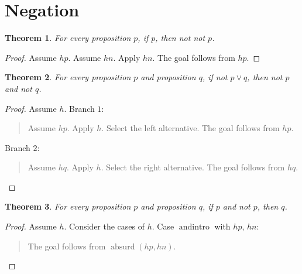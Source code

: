 \documentclass[11pt]{article}
\newtheorem{theorem}{Theorem}[section]
\theoremstyle{definition}
\begin{document}
\section{Negation}
\label{ll:main:negation}
\begin{theorem}
\label{ll:main:double-negation-intro}
For every proposition \(p\), if \(p\), then not not \(p\).
\end{theorem}
\begin{proof}
Assume \(hp\).
Assume \(hn\).
Apply \(hn\).
The goal follows from \(hp\).
\end{proof}
\begin{theorem}
\label{ll:main:de-morgan}
For every proposition \(p\) and proposition \(q\), if not \(p \lor q\), then not \(p\) and not \(q\).
\end{theorem}
\begin{proof}
Assume \(h\).
Branch \(1\):
\begin{quote}
Assume \(hp\).
Apply \(h\).
Select the left alternative.
The goal follows from \(hp\).
\end{quote}
Branch \(2\):
\begin{quote}
Assume \(hq\).
Apply \(h\).
Select the right alternative.
The goal follows from \(hq\).
\end{quote}
\end{proof}
\begin{theorem}
\label{ll:main:explosion}
For every proposition \(p\) and proposition \(q\), if \(p\) and not \(p\), then \(q\).
\end{theorem}
\begin{proof}
Assume \(h\).
Consider the cases of \(h\).
Case \(\operatorname{andintro}\) with \(hp\), \(hn\):
\begin{quote}
The goal follows from \(\operatorname{absurd}(hp, hn)\).
\end{quote}
\end{proof}
\end{document}
